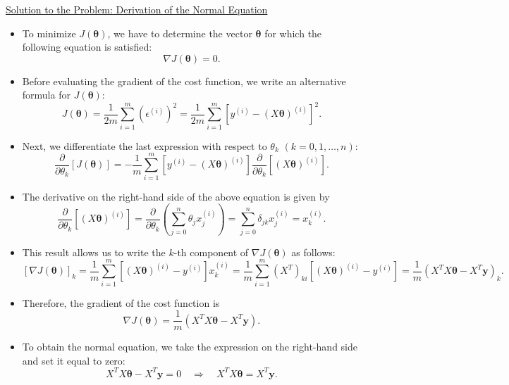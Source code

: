 \documentclass[10pt,american]{scrartcl}
\begin{document}
\uline{Solution to the Problem: Derivation of the Normal Equation}
\begin{itemize}
\item To minimize $J\left(\boldsymbol{\theta}\right)$, we have to determine
the vector $\boldsymbol{\theta}$ for which the following equation
is satisfied:
\[
\nabla J\left(\boldsymbol{\theta}\right)=0.
\]
\item Before evaluating the gradient of the cost function, we write an alternative
formula for $J\left(\boldsymbol{\theta}\right)$:
\[
J\left(\boldsymbol{\theta}\right)=\frac{1}{2m}\sum_{i=1}^{m}\left(\epsilon^{\left(i\right)}\right)^{2}=\frac{1}{2m}\sum_{i=1}^{m}\left[y^{\left(i\right)}-\left(X\boldsymbol{\theta}\right)^{\left(i\right)}\right]^{2}.
\]
\item Next, we differentiate the last expression with respect to $\theta_{k}$
$\left(k=0,1,\ldots,n\right)$:
\[
\frac{\partial}{\partial\theta_{k}}\left[J\left(\boldsymbol{\theta}\right)\right]=-\frac{1}{m}\sum_{i=1}^{m}\left[y^{\left(i\right)}-\left(X\boldsymbol{\theta}\right)^{\left(i\right)}\right]\frac{\partial}{\partial\theta_{k}}\left[\left(X\boldsymbol{\theta}\right)^{\left(i\right)}\right].
\]
\item The derivative on the right-hand side of the above equation is given
by
\[
\frac{\partial}{\partial\theta_{k}}\left[\left(X\boldsymbol{\theta}\right)^{\left(i\right)}\right]=\frac{\partial}{\partial\theta_{k}}\left(\sum_{j=0}^{n}\theta_{j}x_{j}^{\left(i\right)}\right)=\sum_{j=0}^{n}\delta_{jk}x_{j}^{\left(i\right)}=x_{k}^{\left(i\right)}.
\]
\item This result allows us to write the $k$-th component of $\nabla J\left(\boldsymbol{\theta}\right)$
as follows:
\[
\left[\nabla J\left(\boldsymbol{\theta}\right)\right]_{k}=\frac{1}{m}\sum_{i=1}^{m}\left[\left(X\boldsymbol{\theta}\right)^{\left(i\right)}-y^{\left(i\right)}\right]x_{k}^{\left(i\right)}=\frac{1}{m}\sum_{i=1}^{m}\left(X^{T}\right)_{ki}\left[\left(X\boldsymbol{\theta}\right)^{\left(i\right)}-y^{\left(i\right)}\right]=\frac{1}{m}\left(X^{T}X\boldsymbol{\theta}-X^{T}\mathbf{y}\right)_{k}.
\]
\item Therefore, the gradient of the cost function is
\[
\nabla J\left(\boldsymbol{\theta}\right)=\frac{1}{m}\left(X^{T}X\boldsymbol{\theta}-X^{T}\mathbf{y}\right).
\]
\item To obtain the normal equation, we take the expression on the right-hand
side and set it equal to zero:
\[
X^{T}X\boldsymbol{\theta}-X^{T}\mathbf{y}=0\quad\Rightarrow\quad X^{T}X\boldsymbol{\theta}=X^{T}\mathbf{y}.
\]
\end{itemize}
\end{document}
